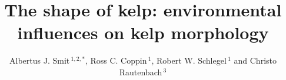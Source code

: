 \documentclass[utf8]{frontiersSCNS} %
\def\firstAuthorLast{Smit {et~al.}} %
\def\Authors{Albertus J. Smit\,$^{1,2,*}$, Ross C. Coppin\,$^{1}$, Robert W. Schlegel\,$^{1}$ and Christo Rautenbach\,$^{3}$}
\begin{document}
\onecolumn
{}

\title[The shape of kelp]{The shape of kelp: environmental influences on kelp morphology}

\author[\firstAuthorLast ]{\Authors} %
\address{} %
\correspondance{} %

\extraAuth{}%


\maketitle
\end{document}
